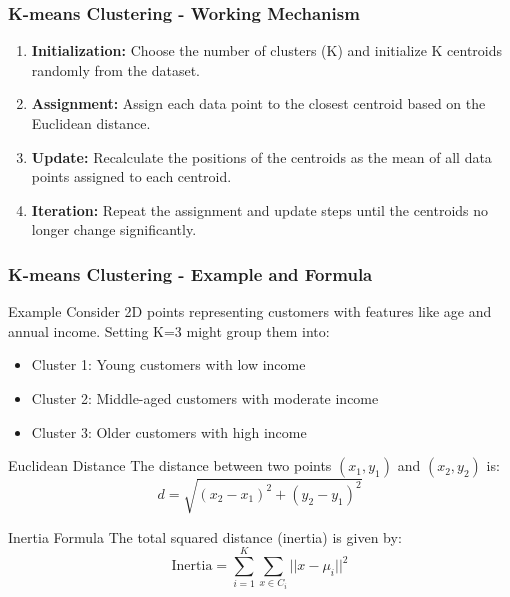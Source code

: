 \documentclass[aspectratio=169]{beamer}
\begin{document}
\begin{frame}[fragile]
    \frametitle{K-means Clustering - Working Mechanism}
    \begin{enumerate}
        \item \textbf{Initialization:} Choose the number of clusters (K) and initialize K centroids randomly from the dataset.
        \item \textbf{Assignment:} Assign each data point to the closest centroid based on the Euclidean distance.
        \item \textbf{Update:} Recalculate the positions of the centroids as the mean of all data points assigned to each centroid.
        \item \textbf{Iteration:} Repeat the assignment and update steps until the centroids no longer change significantly.
    \end{enumerate}
\end{frame}

\begin{frame}[fragile]
    \frametitle{K-means Clustering - Example and Formula}
    \begin{block}{Example}
        Consider 2D points representing customers with features like age and annual income. Setting K=3 might group them into:
        \begin{itemize}
            \item Cluster 1: Young customers with low income
            \item Cluster 2: Middle-aged customers with moderate income
            \item Cluster 3: Older customers with high income
        \end{itemize}
    \end{block}
    \begin{block}{Euclidean Distance}
        The distance between two points \( (x_1, y_1) \) and \( (x_2, y_2) \) is:
        \[
        d = \sqrt{(x_2 - x_1)^2 + (y_2 - y_1)^2}
        \]
    \end{block}
    \begin{block}{Inertia Formula}
        The total squared distance (inertia) is given by:
        \[
        \text{Inertia} = \sum_{i=1}^{K} \sum_{x \in C_i} ||x - \mu_i||^2
        \]
    \end{block}
\end{frame}
\end{document}
